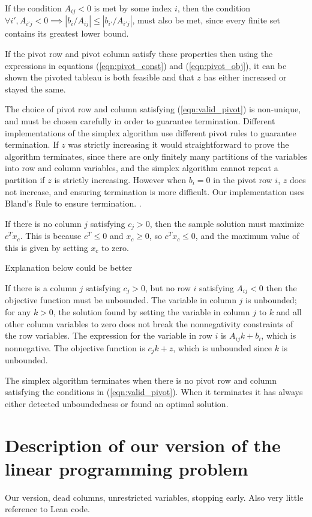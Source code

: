 \documentclass[11pt]{article} %
\begin{document}
If the condition $A_{ij} < 0$ is met by some index $i$, then the condition $\forall i', A_{i'j} < 0 \implies \left|b_i/A_{ij}\right| \le \left|b_{i'} / A_{i'j}\right|$, must also be met, since every finite set contains its greatest lower bound.

If the pivot row and pivot column satisfy these properties then using the expressions in equations (\ref{eqn:pivot_const}) and (\ref{eqn:pivot_obj}), it can be shown the pivoted tableau is both feasible and that $z$ has either increased or stayed the same.

The choice of pivot row and column satisfying (\ref{eqn:valid_pivot}) is non-unique, and must be chosen carefully in order to guarantee termination. Different implementations of the simplex algorithm use different pivot rules to guarantee termination. If $z$ was strictly increasing it would straightforward to prove the algorithm terminates, since there are only finitely many partitions of the variables into row and column variables, and the simplex algorithm cannot repeat a partition if $z$ is strictly increasing. However when $b_i = 0$ in the pivot row $i$, $z$ does not increase, and ensuring termination is more difficult. Our implementation uses Bland's Rule to ensure termination. \cite{Blands_rule}.

If there is no column $j$ satisfying $c_j > 0$, then the sample solution must maximize $c^Tx_c$. This is because $c^T \le 0$ and $x_c \ge 0$, so $c^Tx_c \le 0$, and the maximum value of this is given by setting $x_c$ to zero.

\color{red} Explanation below could be better\color{black}

If there is a column $j$ satisfying $c_j > 0$, but no row $i$ satisfying $A_{ij} < 0$ then the objective function must be unbounded. The variable in column $j$ is unbounded; for any $k > 0$, the solution found by setting the variable in column $j$ to $k$ and all other column variables to zero does not break the nonnegativity constraints of the row variables. The expression for the variable in row $i$ is $A_{ij}k + b_i$, which is nonnegative. The objective function is $c_jk+z$, which is unbounded since $k$ is unbounded.

The simplex algorithm terminates when there is no pivot row and column satisfying the conditions in (\ref{eqn:valid_pivot}). When it terminates it has always either detected unboundedness or found an optimal solution.

\section{Description of our version of the linear programming problem}
\color{red} Our version, dead columns, unrestricted variables, stopping early. Also very little reference to Lean code. \color{black}
\end{document}
